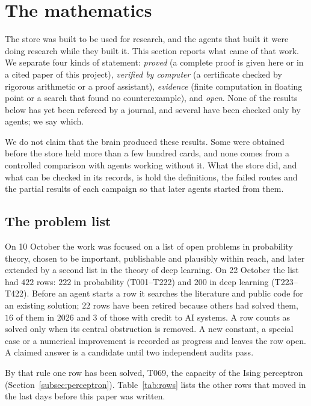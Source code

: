 \section{The mathematics}\label{sec:math}

The store was built to be used for research, and the agents that built it were doing research while they built it. This section reports what came of that work. We separate four kinds of statement: \emph{proved} (a complete proof is given here or in a cited paper of this project), \emph{verified by computer} (a certificate checked by rigorous arithmetic or a proof assistant), \emph{evidence} (finite computation in floating point or a search that found no counterexample), and \emph{open}. None of the results below has yet been refereed by a journal, and several have been checked only by agents; we say which.

We do not claim that the brain produced these results. Some were obtained before the store held more than a few hundred cards, and none comes from a controlled comparison with agents working without it. What the store did, and what can be checked in its records, is hold the definitions, the failed routes and the partial results of each campaign so that later agents started from them.

\subsection{The problem list}
On 10 October the work was focused on a list of open problems in probability theory, chosen to be important, publishable and plausibly within reach, and later extended by a second list in the theory of deep learning. On 22 October the list had $422$ rows: $222$ in probability (T001--T222) and $200$ in deep learning (T223--T422). Before an agent starts a row it searches the literature and public code for an existing solution; $22$ rows have been retired because others had solved them, $16$ of them in 2026 and $3$ of those with credit to AI systems. A row counts as solved only when its central obstruction is removed. A new constant, a special case or a numerical improvement is recorded as progress and leaves the row open. A claimed answer is a candidate until two independent audits pass.

By that rule one row has been solved, T069, the capacity of the Ising perceptron (Section~\ref{subsec:perceptron}). Table~\ref{tab:rows} lists the other rows that moved in the last days before this paper was written.


